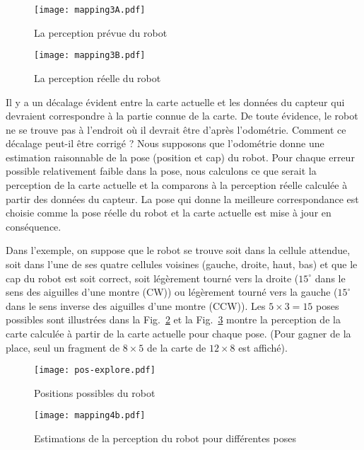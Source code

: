 \begin{figure}
\begin{minipage}{.45\textwidth}
\texttt{[image: mapping3A.pdf]}
\caption{La perception prévue du robot}
\label{fig.mapping3a}
\end{minipage}
\hspace{\fill}
\begin{minipage}{.45\textwidth}
\texttt{[image: mapping3B.pdf]}
\caption{La perception réelle du robot}
\label{fig.mapping3b}
\end{minipage}
\end{figure}

Il y a un décalage évident entre la carte actuelle et les données du capteur qui devraient correspondre à la partie connue de la carte. De toute évidence, le robot ne se trouve pas à l'endroit où il devrait être d'après l'odométrie. Comment ce décalage peut-il être corrigé ? Nous supposons que l'odométrie donne une estimation raisonnable de la pose (position et cap) du robot. Pour chaque erreur possible relativement faible dans la pose, nous calculons ce que serait la perception de la carte actuelle et la comparons à la perception réelle calculée à partir des données du capteur. La pose qui donne la meilleure correspondance est choisie comme la pose réelle du robot et la carte actuelle est mise à jour en conséquence.

Dans l'exemple, on suppose que le robot se trouve soit dans la cellule attendue, soit dans l'une de ses quatre cellules voisines (gauche, droite, haut, bas) et que le cap du robot est soit correct, soit légèrement tourné vers la droite ($15^\circ$ dans le sens des aiguilles d'une montre (CW)) ou légèrement tourné vers la gauche ($15^\circ$ dans le sens inverse des aiguilles d'une montre (CCW)). Les $5\times 3=15$ poses possibles sont illustrées dans la Fig.~\ref{fig.pos-explore} et la Fig.~\ref{fig.mapping4} montre la perception de la carte calculée à partir de la carte actuelle pour chaque pose. (Pour gagner de la place, seul un fragment de $8\times 5$ de la carte de $12\times 8$ est affiché).

\begin{figure}
\begin{center}
\texttt{[image: pos-explore.pdf]}
\end{center}
\caption{Positions possibles du robot}
\label{fig.pos-explore}
\end{figure}

\begin{figure}
\begin{center}
\texttt{[image: mapping4b.pdf]}
\end{center}
\caption{Estimations de la perception du robot pour différentes poses}
\label{fig.mapping4}
\end{figure}

